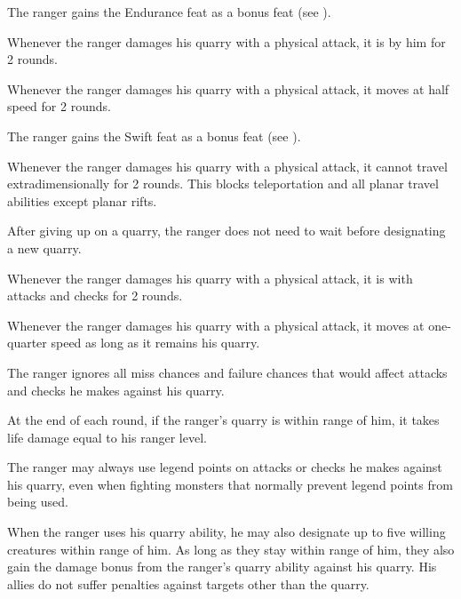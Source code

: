         The ranger gains the Endurance feat as a bonus feat (see ).

        Whenever the ranger damages his quarry with a physical attack, it is \goaded by him for 2 rounds.

        Whenever the ranger damages his quarry with a physical attack, it moves at half speed for 2 rounds.

        The ranger gains the Swift feat as a bonus feat (see ).

        Whenever the ranger damages his quarry with a physical attack, it cannot travel extradimensionally for 2 rounds.
        This blocks teleportation and all planar travel abilities except planar rifts.

        After giving up on a quarry, the ranger does not need to wait before designating a new quarry.

        Whenever the ranger damages his quarry with a physical attack, it is \impaired with attacks and checks for 2 rounds.

        Whenever the ranger damages his quarry with a physical attack, it moves at one-quarter speed as long as it remains his quarry.

        The ranger ignores all miss chances and failure chances that would affect attacks and checks he makes against his quarry.

        At the end of each round, if the ranger's quarry is within \rnglong range of him, it takes life damage equal to his ranger level.

        The ranger may always use legend points on attacks or checks he makes against his quarry, even when fighting monsters that normally prevent legend points from being used.

        When the ranger uses his quarry ability, he may also designate up to five willing creatures within \rnglong range of him.
        As long as they stay within \rnglong range of him, they also gain the damage bonus from the ranger's quarry ability against his quarry.
        His allies do not suffer penalties against targets other than the quarry.

